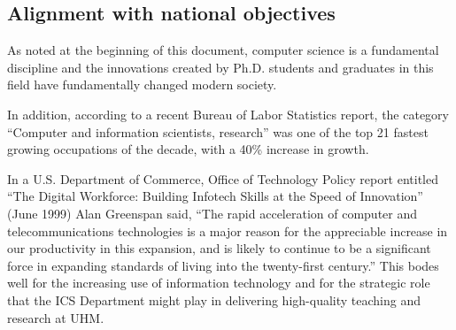 \documentclass[12pt]{article}
\begin{document}
\subsection{Alignment with national objectives}

As noted at the beginning of this document, computer science is a
fundamental discipline and the innovations created by Ph.D. students and
graduates in this field have fundamentally changed modern society. 

In addition, according to a recent Bureau of Labor Statistics report, the
category ``Computer and information scientists, research'' was one of the
top 21 fastest growing occupations of the decade, with a 40\% increase in
growth. 

In a U.S. Department of Commerce, Office of Technology Policy report
entitled “The Digital Workforce: Building Infotech Skills at the Speed of
Innovation” (June 1999) Alan Greenspan said, “The rapid acceleration of
computer and telecommunications technologies is a major reason for the
appreciable increase in our productivity in this expansion, and is likely
to continue to be a significant force in expanding standards of living into
the twenty-first century.” This bodes well for the increasing use of
information technology and for the strategic role that the ICS Department
might play in delivering high-quality teaching and research at UHM.
\end{document}

